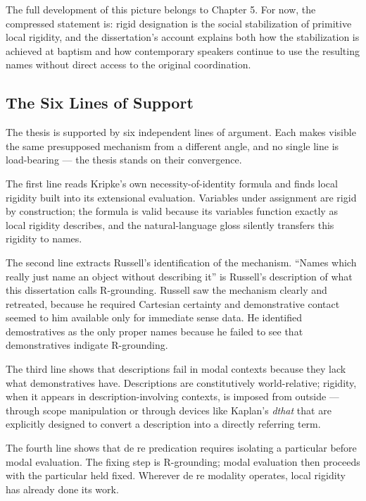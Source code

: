 \documentclass[10pt]{article}
\begin{document}
The full development of this picture belongs to Chapter 5. For now, the compressed statement is: rigid designation is the social stabilization of primitive local rigidity, and the dissertation's account explains both how the stabilization is achieved at baptism and how contemporary speakers continue to use the resulting names without direct access to the original coordination.

\subsection{The Six Lines of Support}\label{the-six-lines-of-support}

The thesis is supported by six independent lines of argument. Each makes visible the same presupposed mechanism from a different angle, and no single line is load-bearing --- the thesis stands on their convergence.

The first line reads Kripke's own necessity-of-identity formula and finds local rigidity built into its extensional evaluation. Variables under assignment are rigid by construction; the formula is valid because its variables function exactly as local rigidity describes, and the natural-language gloss silently transfers this rigidity to names.

The second line extracts Russell's identification of the mechanism. ``Names which really just name an object without describing it'' is Russell's description of what this dissertation calls R-grounding. Russell saw the mechanism clearly and retreated, because he required Cartesian certainty and demonstrative contact seemed to him available only for immediate sense data. He identified demostratives as the only proper names because he failed to see that demonstratives indigate R-grounding.

The third line shows that descriptions fail in modal contexts because they lack what demonstratives have. Descriptions are constitutively world-relative; rigidity, when it appears in description-involving contexts, is imposed from outside --- through scope manipulation or through devices like Kaplan's \emph{dthat} that are explicitly designed to convert a description into a directly referring term.

The fourth line shows that de re predication requires isolating a particular before modal evaluation. The fixing step is R-grounding; modal evaluation then proceeds with the particular held fixed. Wherever de re modality operates, local rigidity has already done its work.
\end{document}
